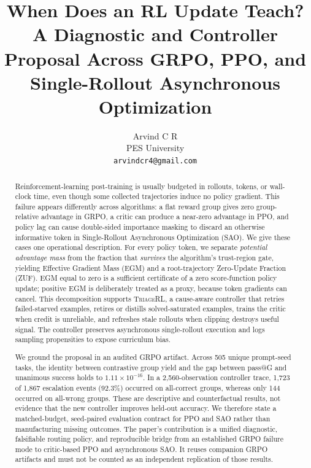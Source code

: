 \documentclass{article}
\title{When Does an RL Update Teach?\\
A Diagnostic and Controller Proposal Across GRPO, PPO, and\\
Single-Rollout Asynchronous Optimization}
\author{Arvind C R\\
PES University\\
\texttt{arvindcr4@gmail.com}}
\newcommand{\method}{\textsc{TriageRL}\xspace}
\begin{document}
\maketitle

\begin{abstract}
Reinforcement-learning post-training is usually budgeted in rollouts, tokens,
or wall-clock time, even though some collected trajectories induce no policy
gradient.  This failure appears differently across algorithms: a flat reward
group gives zero group-relative advantage in GRPO, a critic can produce a
near-zero advantage in PPO, and policy lag can cause double-sided importance
masking to discard an otherwise informative token in Single-Rollout
Asynchronous Optimization (SAO).  We give these cases one operational
description.  For every policy token, we separate \emph{potential advantage
mass} from the fraction that \emph{survives} the algorithm's trust-region
gate, yielding Effective Gradient Mass (EGM) and a root-trajectory
Zero-Update Fraction (ZUF).  EGM equal to zero is a sufficient certificate of
a zero score-function policy update; positive EGM is deliberately treated as
a proxy, because token gradients can cancel.  This decomposition supports
\method, a cause-aware controller that retries failed-starved examples,
retires or distills solved-saturated examples, trains the critic when credit is
unreliable, and refreshes stale rollouts when clipping destroys useful signal.
The controller preserves asynchronous single-rollout execution and logs
sampling propensities to expose curriculum bias.

We ground the proposal in an audited GRPO artifact.  Across 505 unique
prompt-seed tasks, the identity between contrastive group yield and the gap
between pass@G and unanimous success holds to $1.11\times10^{-16}$.  In a
2,560-observation controller trace, 1,723 of 1,867 escalation events (92.3\%)
occurred on all-correct groups, whereas only 144 occurred on all-wrong groups.
These are descriptive and counterfactual results, not evidence that the new
controller improves held-out accuracy.  We therefore state a matched-budget,
seed-paired evaluation contract for PPO and SAO rather than manufacturing
missing outcomes.  The paper's contribution is a unified diagnostic,
falsifiable routing policy, and reproducible bridge from an established GRPO
failure mode to critic-based PPO and asynchronous SAO. It reuses companion GRPO
artifacts and must not be counted as an independent replication of those results.
\end{abstract}
\end{document}
